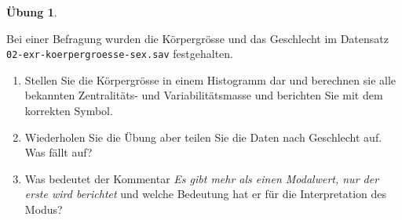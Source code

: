 \documentclass[
]{book}
\providecommand{\tightlist}{%
  \setlength{\itemsep}{0pt}\setlength{\parskip}{0pt}}
\theoremstyle{definition}
\theoremstyle{definition}
\theoremstyle{definition}
\newtheorem{exercise}{Übung}[chapter]
\theoremstyle{definition}
\theoremstyle{remark}
\begin{document}
\begin{exercise}
\protect\hypertarget{exr:koerpergroesse}{}\label{exr:koerpergroesse}\leavevmode

Bei einer Befragung wurden die Körpergrösse und das Geschlecht im Datensatz \texttt{02-exr-koerpergroesse-sex.sav} festgehalten.

\begin{enumerate}
\def\labelenumi{(\alph{enumi})}
\tightlist
\item
  Stellen Sie die Körpergrösse in einem Histogramm dar und berechnen sie alle bekannten Zentralitäts- und Variabilitätsmasse und berichten Sie mit dem korrekten Symbol.
\item
  Wiederholen Sie die Übung aber teilen Sie die Daten nach Geschlecht auf. Was fällt auf?
\item
  Was bedeutet der Kommentar \emph{Es gibt mehr als einen Modalwert, nur der erste wird berichtet} und welche Bedeutung hat er für die Interpretation des Modus?
\end{enumerate}

\end{exercise}
\end{document}
